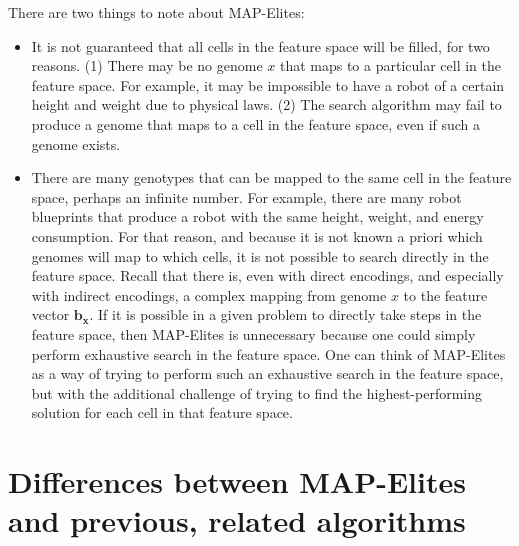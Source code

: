 \documentclass[twocolumn, DIV25, 9pt]{scrartcl}
\newcommand{\todoOfficialVersion}[1]{} %
\begin{document}
There are two things to note about MAP-Elites:
\begin{itemize}
\item{It is not guaranteed that all cells in the feature space will be filled, for two reasons. (1) There may be no genome $x$ that maps to a particular cell in the feature space. For example, it may be impossible to have a robot of a certain height and weight due to physical laws. (2) The search algorithm may fail to produce a genome that maps to a cell in the feature space, even if such a genome exists.}

\item{There are many genotypes that can be mapped to the same cell in the feature space, perhaps an infinite number. For example, there are many robot blueprints that produce a robot with the same height, weight, and energy consumption. For that reason, and because it is not known a priori which genomes will map to which cells, it is not possible to search directly in the feature space. Recall that there is, even with direct encodings, and especially with indirect encodings, a complex mapping from genome $x$ to the feature vector $\mathbf{b_{x}}$. If it is possible in a given problem to directly take steps in the feature space, then MAP-Elites is unnecessary because one could simply perform exhaustive search in the feature space. One can think of MAP-Elites as a way of trying to perform such an exhaustive search in the feature space, but with the additional challenge of trying to find the highest-performing solution for each cell in that feature space.}
\todoOfficialVersion{Also very EC-oriented.}



\end{itemize}

\section{Differences between MAP-Elites and previous, related algorithms}
\end{document}
